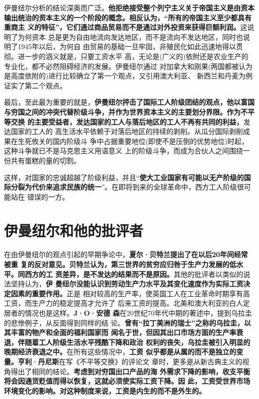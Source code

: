 伊曼纽尔分析的结论深奥而广泛。\textbf{他拒绝接受整个列宁主义关于帝国主义是由资本
  输出统治的资本主义的一个阶段的概念。相反认为，“所有的帝国主义至少都具有重商主
  义的特征”，它们通过商品贸易而不是通过对外投资来获得巨额利润。}这说明了为何资本
总是更为自由地流向发达地区，而不是流向不发达地区，同时也说明了1945年以后，为何自
由贸易的基础一旦牢固，非殖民化如此迅速地得以贯彻。进一步的涵义就是，只要工资水平
高，无论是(广义的)依附还是农业生产的专业化，都不必然阻碍经济的发展。伊曼纽尔通过
对加拿大和刚果(两国都被认为是高度依附的)进行比较确立了第一个观点，又引用澳大利亚、
新西兰和丹麦为例证实了第二个观点。

最后，至此最为重要的就是，\textbf{伊曼纽尔抨击了国际工人阶级团结的观点，他以富国
  与穷国之间的冲突代替阶级斗争，并作为世界资本主义的主要划分界限。作为不平等交换
  的主要受益者，发达国家的工人与落后地区的工人不再有共同的利益，}发达国家的工人的
高生活水平依赖于对落后地区的持续的剥削。从瓜分国际剥削成果在生死攸关的国内阶级斗
争中占据重要地位(即使不是压倒的优势地位)时起，这种斗争就已不是马克思主义用语意义
上的阶级斗争，而成为合伙人之间围绕一份共有蛋糕的量的切割。

这样，对国家的忠诚超越了阶级利益，并且“\textbf{使大工业国家有可能以无产阶级的国
  际分裂为代价来追求民族的统一}”。在即将到来的全球革命中，西方工人阶级很可能站在
错误的一方。
\vfill

\section{伊曼纽尔和他的批评者}

在由伊曼纽尔的观点引起的早期争论中，\textbf{夏尔·贝特兰提出了在以后20年间经常被重
  复的反对意见。贝特兰认为，第三世界的贫穷应归咎于生产力发展的低水平。同西方的工
  资差异，是不发达的结果而不是原因。}其他的批评者以类似的说法坚持认为，\textbf{伊
  曼纽尔没能认识到劳动生产力水平及其变化速度作为实际工资决定因素的重要作用。}正是
相对较高的生产率，使英国工人在工业革命时期享有高工资，而生产力的稳定提高才允许了
后来工资的提高。北美和澳大利亚的白人定居者的情况也是这样。\textbf{J·O·安德
  森}在20世纪70年代中期的著述中，提到乌拉圭的悲惨例子，从反面得到同样的结
论。\textbf{曾有“拉丁美洲的瑞士”之称的乌拉圭，以其丰富的物产和全面的福利国家而
  闻名于世，但因其出口市场方面的生产率衰退，伴随着工人阶级生活水平残酷下降和政治
  权利的丧失，乌拉圭被引入明显的晚期经济衰退之中。}在所有这些情况中，\textbf{工资
  似乎都是从属的而不是独立的变量。}\textbf{亨利·丹尼斯}在写《不平等交换》的评论文
章时，更多是从新古典主义的视角得出了相同的结论。\textbf{考虑到对穷国出口产品的海
  外需求下降的影响，收支平衡将会因通货贬值而得以恢复，这就必须使实际工资下降。因
  此，工资受世界市场环境变化的影响。对这种制度来说，工资是内生的而不是外生的。}


